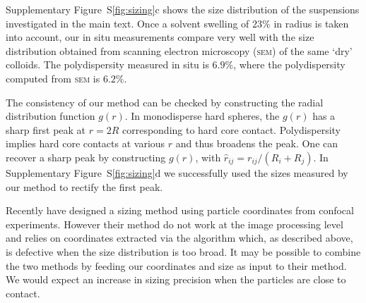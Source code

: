 \documentclass[reprint,notitlepage]{revtex4-1}
\begin{document}
Supplementary Figure~S\ref{fig:sizing}c shows the size distribution of the suspensions investigated in the main text. Once a solvent swelling of $23\%$ in radius is taken into account, our in situ measurements compare very well with the size distribution obtained from scanning electron microscopy (\textsc{sem}) of the same `dry' colloids. The polydispersity measured in situ is $6.9\%$, where the polydispersity computed from \textsc{sem} is $6.2\%$.

The consistency of our method can be checked by constructing the radial distribution function $g(r)$. In monodisperse hard spheres, the $g(r)$ has a sharp first peak at $r=2R$ corresponding to hard core contact. Polydispersity implies hard core contacts at various $r$ and thus broadens the peak. One can recover a sharp peak by constructing $g(\hat{r})$, with $\hat{r}_{ij} = r_{ij}/(R_i+R_j)$. In Supplementary Figure~S\ref{fig:sizing}d we successfully used the sizes measured by our method to rectify the first peak.

Recently \citet{Kurita2011} have designed a sizing method using particle coordinates from confocal experiments. However their method do not work at the image processing level and relies on coordinates extracted via the \citet{Crocker1996} algorithm which, as described above, is defective when the size distribution is too broad. It may be possible to combine the two methods by feeding our coordinates and size as input to their method. We would expect an increase in sizing precision when the particles are close to contact.


%

\end{document}
